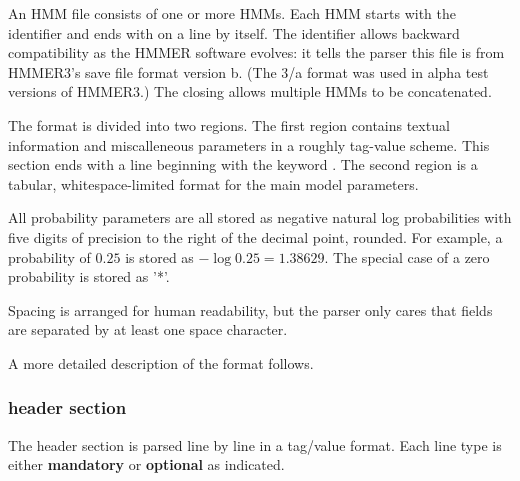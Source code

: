 An HMM file consists of one or more HMMs.  Each HMM starts with the
identifier  and ends with \prog{//} on a line by
itself.  The identifier allows backward compatibility as the HMMER
software evolves: it tells the parser this file is from HMMER3's save
file format version b. (The 3/a format was used in alpha test versions
of HMMER3.)  The closing \prog{//} allows multiple HMMs to be
concatenated.

The format is divided into two regions. The first region contains
textual information and miscalleneous parameters in a roughly
tag-value scheme.  This section ends with a line beginning with the
keyword . The second region is a tabular, whitespace-limited
format for the main model parameters.

All probability parameters are all stored as negative natural log
probabilities with five digits of precision to the right of the
decimal point, rounded. For example, a probability of $0.25$ is stored
as $-\log 0.25 = 1.38629$. The special case of a zero probability is
stored as '*'.

Spacing is arranged for human readability, but the parser only cares
that fields are separated by at least one space character.

A more detailed description of the format follows.

\subsubsection{header section}

The header section is parsed line by line in a tag/value format. Each
line type is either \textbf{mandatory} or \textbf{optional} as
indicated. 

